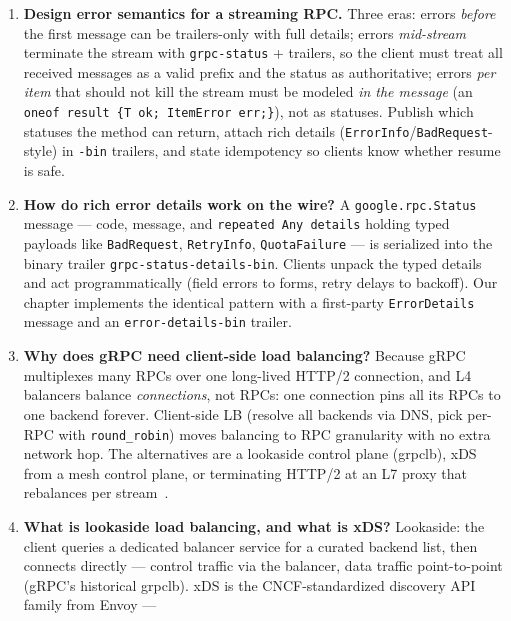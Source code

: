 \begin{enumerate}[label=\textbf{Q\arabic*.}, leftmargin=1.5cm]
  \item \textbf{Design error semantics for a streaming RPC.}
        Three eras: errors \emph{before} the first message can be
        trailers-only with full details; errors \emph{mid-stream} terminate
        the stream with \texttt{grpc-status} + trailers, so the client must
        treat all received messages as a valid prefix and the status as
        authoritative; errors \emph{per item} that should not kill the stream
        must be modeled \emph{in the message} (an \texttt{oneof
        result \{T ok; ItemError err;\}}), not as statuses. Publish which
        statuses the method can return, attach rich details
        (\texttt{ErrorInfo}/\texttt{BadRequest}-style) in \texttt{-bin}
        trailers, and state idempotency so clients know whether resume is safe.
  \item \textbf{How do rich error details work on the wire?}
        A \texttt{google.rpc.Status} message --- code, message, and
        \texttt{repeated Any details} holding typed payloads like
        \texttt{BadRequest}, \texttt{RetryInfo}, \texttt{QuotaFailure} --- is
        serialized into the binary trailer \texttt{grpc-status-details-bin}.
        Clients unpack the typed details and act programmatically (field
        errors to forms, retry delays to backoff). Our chapter implements the
        identical pattern with a first-party \texttt{ErrorDetails} message and
        an \texttt{error-details-bin} trailer.
  \item \textbf{Why does gRPC need client-side load balancing?}
        Because gRPC multiplexes many RPCs over one long-lived HTTP/2
        connection, and L4 balancers balance \emph{connections}, not RPCs: one
        connection pins all its RPCs to one backend forever. Client-side LB
        (resolve all backends via DNS, pick per-RPC with \texttt{round\_robin})
        moves balancing to RPC granularity with no extra network hop. The
        alternatives are a lookaside control plane (grpclb), xDS from a mesh
        control plane, or terminating HTTP/2 at an L7 proxy that rebalances
        per stream~\cite{newman2021microservices}.
  \item \textbf{What is lookaside load balancing, and what is xDS?}
        Lookaside: the client queries a dedicated balancer service for a
        curated backend list, then connects directly --- control traffic via
        the balancer, data traffic point-to-point (gRPC's historical grpclb).
        xDS is the CNCF-standardized discovery API family from Envoy ---

\end{enumerate}
